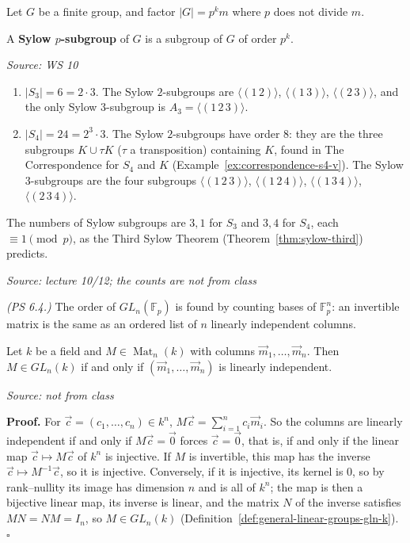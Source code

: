 \documentclass[11pt]{report}
\renewenvironment{proof}[1][Proof]{\noindent\textbf{#1.} }{\hfill$\square$\par\vspace{5pt}}
\newcommand{\srcline}[1]{\par\hfill{\footnotesize\textit{Source: #1}}}
\begin{document}
Let $G$ be a finite group, and factor $|G| = p^k m$ where $p$ does not divide $m$.

\begin{defbox}\label{def:sylow-subgroup}
A \textbf{Sylow $p$-subgroup} of $G$ is a subgroup of $G$ of order $p^k$.
\srcline{WS 10}
\end{defbox}

\begin{exbox}\label{ex:sylow-s3-s4}
\begin{enumerate}
    \item $|S_3| = 6 = 2 \cdot 3$. The Sylow $2$-subgroups are $\langle (1\,2) \rangle$, $\langle (1\,3) \rangle$, $\langle (2\,3) \rangle$, and the only Sylow $3$-subgroup is $A_3 = \langle (1\,2\,3) \rangle$.
    \item $|S_4| = 24 = 2^3 \cdot 3$. The Sylow $2$-subgroups have order $8$: they are the three subgroups $K \cup \tau K$ ($\tau$ a transposition) containing $K$, found in The Correspondence for $S_4$ and $K$ (Example~\ref{ex:correspondence-s4-v}). The Sylow $3$-subgroups are the four subgroups $\langle (1\,2\,3) \rangle$, $\langle (1\,2\,4) \rangle$, $\langle (1\,3\,4) \rangle$, $\langle (2\,3\,4) \rangle$.
\end{enumerate}
The numbers of Sylow subgroups are $3, 1$ for $S_3$ and $3, 4$ for $S_4$, each $\equiv 1 \pmod p$, as the Third Sylow Theorem (Theorem~\ref{thm:sylow-third}) predicts.
\srcline{lecture 10/12; the counts are not from class}
\end{exbox}

\textit{(PS 6.4.)} The order of $GL_n(\mathbb{F}_p)$ is found by counting bases of $\mathbb{F}_p^n$: an invertible matrix is the same as an ordered list of $n$ linearly independent columns.

\begin{lembox}\label{lem:invertible-iff-columns-independent}
Let $k$ be a field and $M \in \operatorname{Mat}_n(k)$ with columns $\vec m_1, \ldots, \vec m_n$. Then $M \in GL_n(k)$ if and only if $(\vec m_1, \ldots, \vec m_n)$ is linearly independent.
\srcline{not from class}
\end{lembox}

\begin{proof}
For $\vec c = (c_1, \ldots, c_n) \in k^n$, $M\vec c = \sum_{i=1}^n c_i \vec m_i$. So the columns are linearly independent if and only if $M\vec c = \vec 0$ forces $\vec c = \vec 0$, that is, if and only if the linear map $\vec c \mapsto M\vec c$ of $k^n$ is injective. If $M$ is invertible, this map has the inverse $\vec c \mapsto M^{-1}\vec c$, so it is injective. Conversely, if it is injective, its kernel is $0$, so by rank--nullity its image has dimension $n$ and is all of $k^n$; the map is then a bijective linear map, its inverse is linear, and the matrix $N$ of the inverse satisfies $MN = NM = I_n$, so $M \in GL_n(k)$ (Definition~\ref{def:general-linear-groups-gln-k}).
\end{proof}
\end{document}
